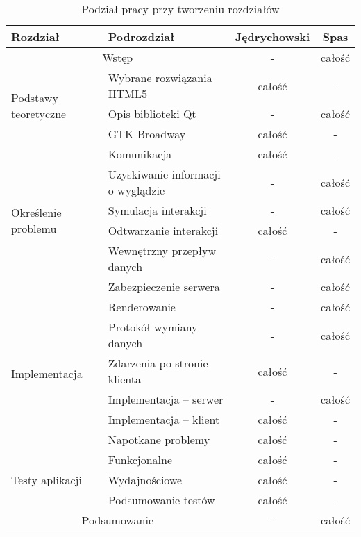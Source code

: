 \begin{table}[H]
\centering  
\begin{tabular}{ |l|l|c|c|}
\hline
\textbf{Rozdział} & \textbf{Podrozdział}              & \textbf{Jędrychowski} & \textbf{Spas}   \\
\hline
\multicolumn{2}{|c|}{Wstęp} & - & całość \\
\hline 
\multirow{3}{*}{Podstawy teoretyczne} & Wybrane rozwiązania HTML5 & całość & -  \\
 & Opis biblioteki Qt & - & całość  \\
 & GTK Broadway & całość & -  \\
 \hline
 \multirow{6}{*}{Określenie problemu} & Komunikacja & całość & -  \\
  & Uzyskiwanie informacji o wyglądzie & - & całość  \\
  & Symulacja interakcji & - & całość  \\
  & Odtwarzanie interakcji& całość & -  \\
  & Wewnętrzny przepływ danych & - & całość  \\
  & Zabezpieczenie serwera & - & całość  \\
  \hline
  \multirow{6}{*}{Implementacja} & Renderowanie & - & całość  \\
   & Protokół wymiany danych & - & całość  \\
   & Zdarzenia po stronie klienta & całość & -  \\
   & Implementacja -- serwer & - & całość  \\
   & Implementacja -- klient & całość & -  \\
   & Napotkane problemy & całość & -  \\
   \hline
   \multirow{3}{*}{Testy aplikacji} & Funkcjonalne & całość & -  \\
     & Wydajnościowe & całość & -  \\
     & Podsumowanie testów & całość & -  \\
   \hline
   \multicolumn{2}{|c|}{Podsumowanie} & - & całość \\
   \hline

\end{tabular}
\caption{Podział pracy przy tworzeniu rozdziałów}
\label{tab:podzial}
\end{table}